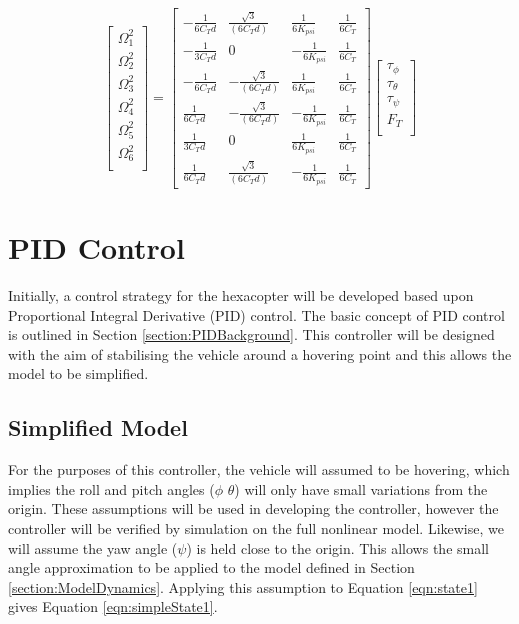 \begin{equation}\label{eqn:propSpeeds2}
\begin{bmatrix}
\Omega^{2}_{1}\\
\Omega^{2}_{2}\\
\Omega^{2}_{3}\\
\Omega^{2}_{4}\\
\Omega^{2}_{5}\\
\Omega^{2}_{6}\\
\end{bmatrix}
=
\begin{bmatrix}
-\frac{1}{6C_{T}d} & \frac{\sqrt{3}}{(6C_{T}d)} &  \frac{1}{6K_{psi}} & \frac{1}{6C_{T}}\\
-\frac{1}{3C_{T}d} & 0 & -\frac{1}{6K_{psi}} & \frac{1}{6C_{T}}\\
-\frac{1}{6C_{T}d} & -\frac{\sqrt{3}}{(6C_{T}d)} & \frac{1}{6K_{psi}} & \frac{1}{6C_{T}}\\
 \frac{1}{6C_{T}d} & -\frac{\sqrt{3}}{(6C_{T}d)} & -\frac{1}{6K_{psi}} & \frac{1}{6C_{T}}\\
 \frac{1}{3C_{T}d} & 0 & \frac{1}{6K_{psi}} & \frac{1}{6C_{T}}\\
 \frac{1}{6C_{T}d} &  \frac{\sqrt{3}}{(6C_{T}d)} & -\frac{1}{6K_{psi}} & \frac{1}{6C_{T}}
\end{bmatrix}
\begin{bmatrix}
\tau_{\phi}\\
\tau_{\theta}\\
\tau_{\psi}\\
F_{T}\\
\end{bmatrix}
\end{equation}

\section{PID Control}
Initially, a control strategy for the hexacopter will be developed based upon Proportional Integral Derivative (PID) control. The basic concept of PID control is outlined in Section \ref{section:PIDBackground}. This controller will be designed with the aim of stabilising the vehicle around a hovering point and this allows the model to be simplified.
\subsection{Simplified Model}\label{section:SimpleModel}
For the purposes of this controller, the vehicle will assumed to be hovering, which implies the roll and pitch angles ($\phi$ $\theta$) will only have small variations from the origin. These assumptions will be used in developing the controller, however the controller will be verified by simulation on the full nonlinear model. Likewise, we will assume the yaw angle ($\psi$) is held close to the origin. This allows the small angle approximation to be applied to the model defined in Section \ref{section:ModelDynamics}. Applying this assumption to Equation \ref{eqn:state1} gives Equation \ref{eqn:simpleState1}.

